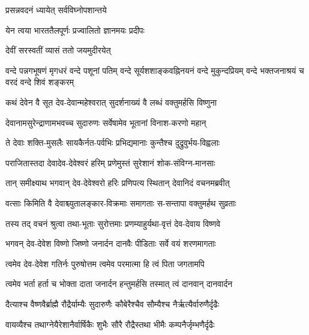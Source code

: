 
{प्रसन्नवदनं ध्यायेत् सर्वविघ्नोपशान्तये}

{येन त्वया भारततैलपूर्णः प्रज्वालितो ज्ञानमयः प्रदीपः}%


{देवीं सरस्वतीं व्यासं ततो जयमुदीरयेत्}


{वन्दे पन्नगभूषणं मृगधरं वन्दे पशूनां पतिम्}
{वन्दे सूर्यशशाङ्कवह्निनयनं वन्दे मुकुन्दप्रियम्}
{वन्दे भक्तजनाश्रयं च वरदं वन्दे शिवं शङ्करम्}



\twolineshloka
{कथं देवेन वै सूत देव-देवान्महेश्वरात्}
{सुदर्शनाख्यं वै लब्धं वक्तुमर्हसि विष्णुना} %


\twolineshloka
{देवानामसुरेन्द्राणामभवच्च सुदारुणः}
{सर्वेषामेव भूतानां विनाश-करणो महान्} %

\twolineshloka
{ते देवाः शक्ति-मुसलैः सायकैर्नत-पर्वभिः}
{प्रभिद्यमानाः कुन्तैश्च दुद्रुवुर्भय-विह्वलाः} %

\twolineshloka
{पराजितास्तदा देवादेव-देवेश्वरं हरिम्}
{प्रणेमुस्तं सुरेशानं शोक-संविग्न-मानसाः} %

\twolineshloka
{तान् समीक्ष्याथ भगवान् देव-देवेश्वरो हरिः}
{प्रणिपत्य स्थितान् देवानिदं वचनमब्रवीत्} %

\twolineshloka
{वत्साः किमिति वै देवाश्च्युतालङ्कार-विक्रमाः}
{समागताः स-सन्तापा वक्तुमर्हथ सुव्रताः} %

\twolineshloka
{तस्य तद् वचनं श्रुत्वा तथा-भूताः सुरोत्तमाः}
{प्रणम्याहुर्यथा-वृत्तं देव-देवाय विष्णवे} %

\twolineshloka
{भगवन् देव-देवेश विष्णो जिष्णो जनार्दन}
{दानवैः पीडिताः सर्वे वयं शरणमागताः} %

\twolineshloka
{त्वमेव देव-देवेश गतिर्नः पुरुषोत्तम}
{त्वमेव परमात्मा हि त्वं पिता जगतामपि} %

\twolineshloka
{त्वमेव भर्ता हर्ता च भोक्ता दाता जनार्दन}
{हन्तुमर्हसि तस्मात् त्वं दानवान् दानवार्दन} %

\twolineshloka
{दैत्याश्च वैष्णवैर्ब्राह्मै रौद्रैर्याम्यैः सुदारुणैः}
{कौबेरैश्चैव सौम्यैश्च नैर्ऋत्यैर्वारुणैर्दृढैः} %

\twolineshloka
{वायव्यैश्च तथाग्नेयैरेशानैर्वार्षिकैः शुभैः}
{सौरै रौद्रैस्तथा भीमैः कम्पनैर्जृम्भणैर्दृढैः} %


